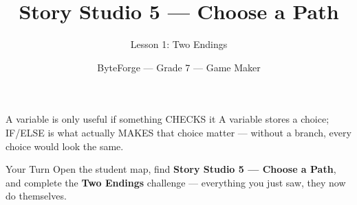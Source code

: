 \documentclass[aspectratio=169]{beamer}
\title{Story Studio 5 — Choose a Path}
\subtitle{Lesson 1: Two Endings}
\author{ByteForge --- Grade 7 --- Game Maker}
\date{}
\begin{document}
\begin{frame}
    \titlepage
\end{frame}

\begin{frame}{A variable is only useful if something CHECKS it}
    \Large
    A variable stores a choice; IF/ELSE is what actually MAKES that choice matter — without a branch, every choice would look the same.

    \begin{center}
    \end{center}
\end{frame}

\begin{frame}{Your Turn}
    \Large
    Open the student map, find \textbf{Story Studio 5 — Choose a Path}, and complete
    the \textbf{Two Endings} challenge --- everything you just saw, they now do themselves.
\end{frame}
\end{document}
